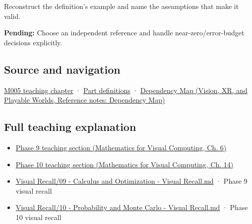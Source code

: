 \hypertarget{appendix-3ae74e89b4e6-recall-and-next-depth}{}

Reconstruct the definition's example and name the assumptions that make it valid.

\textbf{Pending:} Choose an independent reference and handle near-zero/error-budget decisions explicitly.

\subsection{Source and navigation}\label{appendix-3ae74e89b4e6-source-and-navigation}

\hypertarget{appendix-3ae74e89b4e6-source-and-navigation}{}

\hyperref[01-foundations-i-ch001-when-arithmetic-meets-uncertainty]{M005 teaching chapter} · \hyperref[appendix-fd090d982a15-m005---parts-77-88]{Part definitions} · \href{../07-Vision-XR-and-Playable-Worlds/main.pdf\#nameddest=appendix-4ad47bdd269a}{Dependency Map (Vision, XR, and Playable Worlds, Reference notes: Dependency Map)}

\subsection{Full teaching explanation}\label{appendix-3ae74e89b4e6-full-teaching-explanation}

\hypertarget{appendix-3ae74e89b4e6-full-teaching-explanation}{}

\begin{itemize}
\tightlist
\item
  \href{../02-Mathematics-for-Visual-Computing/main.pdf\#nameddest=02-foundations-ii-ch022-numerical-differentiation-and-automatic-differentiation}{Phase 9 teaching section (Mathematics for Visual Computing, Ch. 6)}
\item
  \href{../02-Mathematics-for-Visual-Computing/main.pdf\#nameddest=02-foundations-ii-ch030-inference-and-error-metrics-need-explicit-assumptions}{Phase 10 teaching section (Mathematics for Visual Computing, Ch. 14)}
\item
  \hyperref[appendix-adf48f5dc5c1]{Visual Recall/09 - Calculus and Optimization - Visual Recall.md} · Phase 9 visual recall
\item
  \hyperref[appendix-cb5af353ef77]{Visual Recall/10 - Probability and Monte Carlo - Visual Recall.md} · Phase 10 visual recall
\end{itemize}
